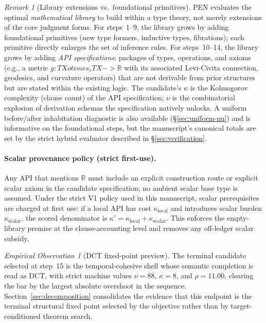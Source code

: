 \documentclass[11pt,a4paper]{article}
\def\to{->}%
\def\otimes{otimes}%
\theoremstyle{plain}
\theoremstyle{definition}
\theoremstyle{remark}
\newtheorem{remark}[theorem]{Remark}
\newtheorem{observation}[theorem]{Empirical Observation}
\newcommand{\R}{\mathbb{R}}
\begin{document}
\begin{remark}[Library extensions vs.\ foundational primitives]
\label{rem:library-api}
PEN evaluates the optimal \emph{mathematical library} to build within a type theory, not merely extensions of the core judgment forms.
For steps~1--9, the library grows by adding foundational primitives (new type formers, inductive types, fibrations); each primitive directly enlarges the set of inference rules.
For steps~10--14, the library grows by adding \emph{API specifications}: packages of types, operations, and axioms (e.g., a metric $g : TX \otimes_s TX \to \R$ with its associated Levi-Civita connection, geodesics, and curvature operators) that are not derivable from prior structures but are stated within the existing logic.
The candidate's $\kappa$ is the Kolmogorov complexity (clause count) of the API specification; $\nu$ is the combinatorial explosion of derivation schemas the specification natively unlocks.
A uniform before/after inhabitation diagnostic is also available (\S\ref{sec:uniform-nu}) and is informative on the foundational steps, but the manuscript's canonical totals are set by the strict hybrid evaluator described in \S\ref{sec:verification}.
\paragraph{Scalar provenance policy (strict first-use).}
Any API that mentions $\R$ must include an explicit construction route or explicit scalar axiom in the candidate specification; no ambient scalar base type is assumed.
Under the strict V1 policy used in this manuscript, scalar prerequisites are charged at first use: if a local API has cost $\kappa_{\mathrm{local}}$ and introduces scalar burden $\kappa_{\mathrm{scalar}}$, the scored denominator is $\kappa' = \kappa_{\mathrm{local}} + \kappa_{\mathrm{scalar}}$.
This enforces the empty-library premise at the clause-accounting level and removes any off-ledger scalar subsidy.
\end{remark}

\begin{observation}[DCT fixed-point preview]
\label{thm:spectral-preview}
The terminal candidate selected at step~15 is the temporal-cohesive shell whose semantic completion is read as DCT, with strict machine values $\nu=88$, $\kappa=8$, and $\rho=11.00$, clearing the bar by the largest absolute overshoot in the sequence.
Section~\ref{sec:decomposition} consolidates the evidence that this endpoint is the terminal structural fixed point selected by the objective rather than by target-conditioned theorem search.
\end{observation}
\end{document}
